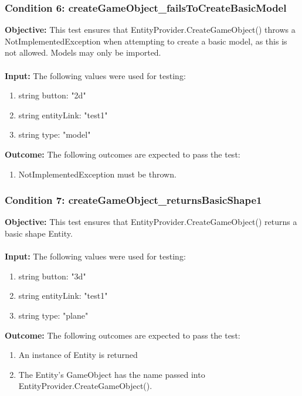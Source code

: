 \documentclass[a4paper,12pt]{article}
\begin{document}
		\subsubsection{Condition 6: createGameObject\_failsToCreateBasicModel}
			\textbf{Objective:} This test ensures that EntityProvider.CreateGameObject() throws a NotImplementedException when attempting to create a basic model, as this is not allowed. Models may only be imported.\\\\
			\textbf{Input:} The following values were used for testing:
				\begin{enumerate}
					\item string button: "2d"
					\item string entityLink: "test1"
					\item string type: "model"
				\end{enumerate}
			\textbf{Outcome:} The following outcomes are expected to pass the test:
				\begin{enumerate}
					\item NotImplementedException must be thrown.
				\end{enumerate}
		\subsubsection{Condition 7: createGameObject\_returnsBasicShape1}
			\textbf{Objective:} This test ensures that EntityProvider.CreateGameObject() returns a basic shape Entity.\\\\
			\textbf{Input:} The following values were used for testing:
				\begin{enumerate}
					\item string button: "3d"
					\item string entityLink: "test1"
					\item string type: "plane"
				\end{enumerate}
			\textbf{Outcome:} The following outcomes are expected to pass the test:
				\begin{enumerate}
					\item An instance of Entity is returned
					\item The Entity's GameObject has the name passed into EntityProvider.CreateGameObject().
				\end{enumerate}
\end{document}
